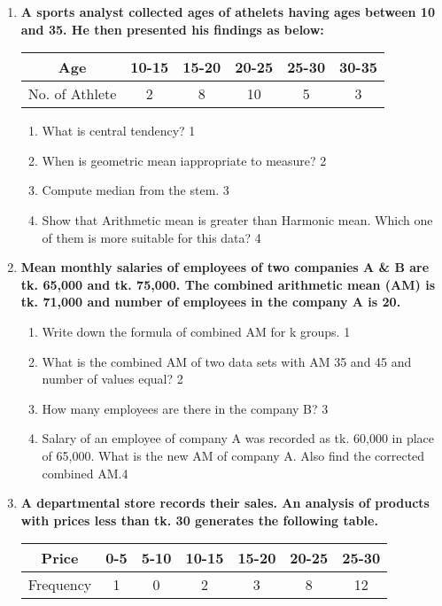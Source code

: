 \documentclass[a4paper,oneside]{book}
\begin{document}
\begin{enumerate}
  
     \item
	  \textbf{A sports analyst collected ages of athelets having ages between 10 and 35. He then presented his findings as below:} 
	  
	  \begin{table}[h]
	    \centering
\begin{tabular}{c|c|c|c|c|c}
Age            & 10-15 & 15-20 & 20-25 & 25-30 & 30-35 \\ \hline
No. of Athlete & 2     & 8     & 10    & 5     & 3    
\end{tabular}
\end{table}
  
  \begin{enumerate}
    \item
	What is central tendency? \hfill 1
    \item
	When is geometric mean iappropriate to measure? \hfill 2
    \item  
	Compute median from the stem. \hfill 3
    \item
	Show that Arithmetic mean is greater than Harmonic mean. Which one of them is more suitable for this data? \hfill 4
  \end{enumerate}

   \item
	  \textbf{Mean monthly salaries of employees of two companies A \& B are tk. 
	  65,000 and tk. 75,000. The combined arithmetic mean (AM) is tk. 
	  71,000 and number of employees in the company A is 20.} 
	  
  \begin{enumerate}
    \item
	Write down the formula of combined AM for k groups. \hfill 1
    \item
	What is the combined AM of two data sets with AM 35 and 45 and number of values equal? \hfill 2
    \item  
	How many employees are there in the company B? \hfill 3
    \item
	Salary of an employee of company A was recorded as tk. 60,000 in place of
	65,000. What is the new AM of company A. Also find the corrected combined AM.\hfill 4
  \end{enumerate}

     \item
	  \textbf{A departmental store records their sales. An analysis of products with prices less than tk. 30 generates the following table.} 
	  
\begin{table}[h]
\centering
\begin{tabular}{c|c|c|c|c|c|c}
Price     & 0-5 & 5-10 & 10-15 & 15-20 & 20-25 & 25-30 \\ \hline
Frequency & 1   & 0    & 2     & 3     & 8     & 12   
\end{tabular}
\end{table}
  

\end{enumerate}
\end{document}
